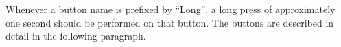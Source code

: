 %
Whenever a button name is prefixed by ``Long'', a long press of approximately
one second should be performed on that button. The buttons are described in
detail in the following paragraph.
